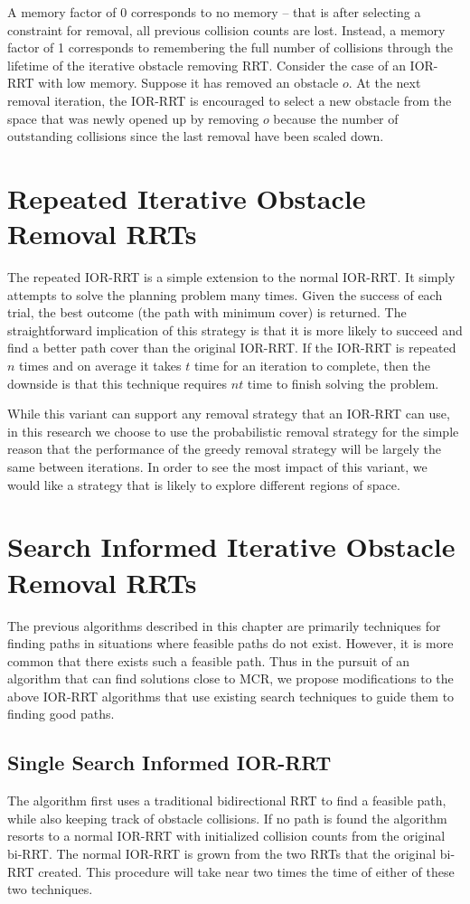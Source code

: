A memory factor of 0 corresponds to no memory -- that is after selecting a constraint for removal, all previous collision counts are lost. Instead, a memory factor of 1 corresponds to remembering the full number of collisions through the lifetime of the iterative obstacle removing RRT. Consider the case of an IOR-RRT with low memory. Suppose it has removed an obstacle $o$. At the next removal iteration, the IOR-RRT is encouraged to select a new obstacle from the space that was newly opened up by removing $o$ because the number of outstanding collisions since the last removal have been scaled down. 

\section{Repeated Iterative Obstacle Removal RRTs}
The repeated IOR-RRT is a simple extension to the normal IOR-RRT. It simply attempts to solve the planning problem many times. Given the success of each trial, the best outcome (the path with minimum cover) is returned. The straightforward implication of this strategy is that it is more likely to succeed and find a better path cover than the original IOR-RRT. If the IOR-RRT is repeated $n$ times and on average it takes $t$ time for an iteration to complete, then the downside is that this technique requires $nt$ time to finish solving the problem.

While this variant can support any removal strategy that an IOR-RRT can use, in this research we choose to use the probabilistic removal strategy for the simple reason that the performance of the greedy removal strategy will be largely the same between iterations. In order to see the most impact of this variant, we would like a strategy that is likely to explore different regions of space.

\section{Search Informed Iterative Obstacle Removal RRTs}
The previous algorithms described in this chapter are primarily techniques for finding paths in situations where feasible paths do not exist. However, it is more common that there exists such a feasible path. Thus in the pursuit of an algorithm that can find solutions close to MCR, we propose modifications to the above IOR-RRT algorithms that use existing search techniques to guide them to finding good paths.

\subsection{Single Search Informed IOR-RRT}
The algorithm first uses a traditional bidirectional RRT to find a feasible path, while also keeping track of obstacle collisions. If no path is found the algorithm resorts to a normal IOR-RRT with initialized collision counts from the original bi-RRT. The normal IOR-RRT is grown from the two RRTs that the original bi-RRT created. This procedure will take near two times the time of either of these two techniques.

